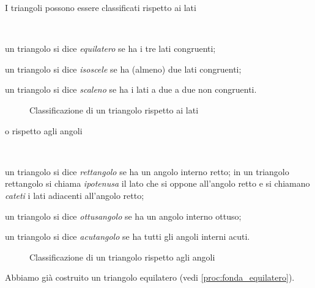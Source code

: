 I triangoli possono essere classificati rispetto ai lati
\begin{definizione}~
\begin{itemize*}
\item un triangolo si dice \emph{equilatero} se ha i tre lati 
congruenti;
\item un triangolo si dice \emph{isoscele} se ha (almeno) due lati 
congruenti;
\item un triangolo si dice \emph{scaleno} se ha i lati a due a due 
non congruenti.
\end{itemize*}
\end{definizione}


\begin{inaccessibleblock}
 \begin{figure}[htb]
\centering
\caption{Classificazione di un triangolo rispetto ai 
lati}\label{fig:class_triangolo_lati}
\end{figure}
\end{inaccessibleblock}

\noindent o rispetto agli angoli
\begin{definizione}~
\begin{itemize*}
\item un triangolo si dice \emph{rettangolo} se ha un angolo interno 
retto; in un triangolo rettangolo si chiama \emph{ipotenusa} il lato 
che si oppone all'angolo retto e si chiamano \emph{cateti} i lati 
adiacenti all'angolo retto;
\item un triangolo si dice \emph{ottusangolo} se ha un angolo interno 
ottuso;
\item un triangolo si dice \emph{acutangolo} se ha tutti gli angoli 
interni acuti.
\end{itemize*}
\end{definizione}


\begin{inaccessibleblock}
\begin{figure}[htb]
\centering
\caption{Classificazione di un triangolo rispetto agli angoli}
\label{fig:class_triangolo_angoli}
\end{figure}
\end{inaccessibleblock}

Abbiamo già costruito un triangolo equilatero 
(vedi \ref{proc:fonda_equilatero}).

